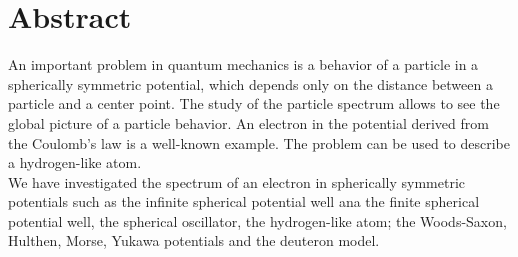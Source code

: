 \documentclass[a4paper, 14pt]{article}
\begin{document}
\section{Abstract}
An important problem in quantum mechanics is a behavior of a particle in a spherically symmetric potential, which depends only on the distance between a particle and a center point. The study of the particle spectrum allows  to see the global picture of a particle behavior. An electron in the potential derived from the Coulomb's law is a well-known example. The problem can be used to describe a hydrogen-like atom. \\
We have investigated the spectrum of an electron in spherically symmetric potentials such as the infinite spherical potential well ana the finite spherical potential well, the spherical oscillator, the hydrogen-like atom; the Woods-Saxon, Hulthen, Morse, Yukawa potentials and the deuteron model.











%
%
\end{document}
